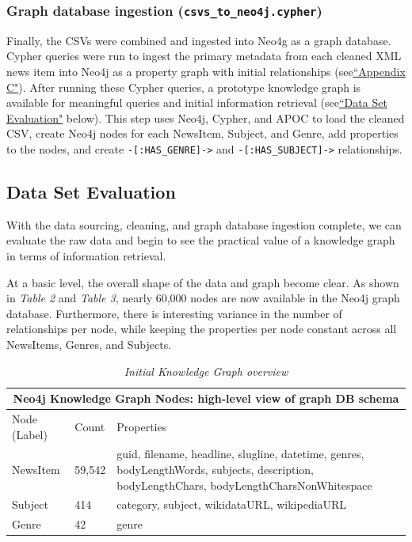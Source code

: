\documentclass[11pt]{article}
\begin{document}
  \subsubsection{Graph database ingestion (\lstinline{csvs_to_neo4j.cypher})}
  Finally, the CSVs were combined and ingested into Neo4g as a graph database. Cypher queries were run to ingest the primary metadata from each cleaned XML news item into Neo4j as a property graph with initial relationships (see\hyperref[sec:AppendixC]{``Appendix C"}). After running these Cypher queries, a prototype knowledge graph is available for meaningful queries and initial information retrieval (see\hyperref[sec:DataSetEvaluation]{``Data Set Evaluation"} below). This step uses Neo4j, Cypher, and APOC to load the cleaned CSV, create Neo4j nodes for each NewsItem, Subject, and Genre, add properties to the nodes, and create \lstinline{-[:HAS_GENRE]->} and \lstinline{-[:HAS_SUBJECT]->} relationships.



\subsection{Data Set Evaluation}
\label{sec:DataSetEvaluation}

With the data sourcing, cleaning, and graph database ingestion complete, we can evaluate the raw data and begin to see the practical value of a knowledge graph in terms of information retrieval.

At a basic level, the overall shape of the data and graph become clear. As shown in \textit{Table 2} and \textit{Table 3}, nearly 60,000 nodes are now available in the Neo4j graph database. Furthermore, there is interesting variance in the number of relationships per node, while keeping the properties per node constant across all NewsItems, Genres, and Subjects.


\begin{table}
  \begin{tabular}{ |p{3cm}||p{2cm}|p{7cm}|  }
  \hline
  \multicolumn{3}{|c|}{Neo4j Knowledge Graph Nodes: high-level view of graph DB schema} \\
  \hline
  Node (Label)& Count &Properties\\
  \hline
  NewsItem&59,542&guid, filename, headline, slugline, datetime, genres, bodyLengthWords, subjects, description, bodyLengthChars, bodyLengthCharsNonWhitespace\\
  \hline
  Subject&414&category, subject, wikidataURL, wikipediaURL\\
  \hline
  Genre&42&genre\\
  \hline
  \end{tabular}
  \caption{\textit{Initial Knowledge Graph overview}}
\end{table}
\end{document}
